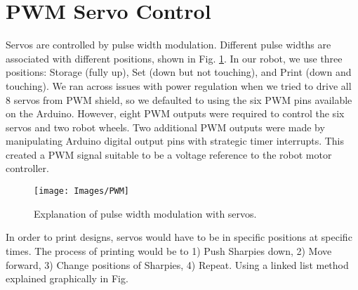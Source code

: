 \documentclass[11pt, oneside]{article}
\begin{document}
\section{PWM Servo Control}
Servos are controlled by pulse width modulation. Different pulse widths are associated with different positions, shown in Fig. \ref{fig:servoPWM}. In our robot, we use three positions: Storage (fully up), Set (down but not touching), and Print (down and touching). We ran across issues with power regulation when we tried to drive all 8 servos from PWM shield, so we defaulted to using the six PWM pins available on the Arduino. However, eight PWM outputs were required to control the  six servos and two robot wheels. Two additional PWM outputs were made by manipulating Arduino digital output pins with strategic timer interrupts. This created a PWM signal suitable to be a voltage reference to the robot motor controller.

\begin{figure}[H]
    \centering
    \texttt{[image: Images/PWM]}
    \caption{Explanation of pulse width modulation with servos.}
    \label{fig:servoPWM}
\end{figure}

In order to print designs, servos would have to be in specific positions at specific times. The process of printing would be to 1) Push Sharpies down, 2) Move forward, 3) Change positions of Sharpies, 4) Repeat. Using a linked list method explained graphically in Fig. 
\end{document}
